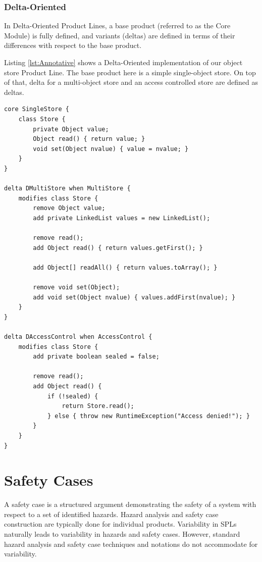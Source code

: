 \documentclass[11pt]{article}
\begin{document}
\subsubsection{Delta-Oriented}

In Delta-Oriented \cite{Schaefer} Product Lines, a base product (referred to as the Core Module) is fully defined, and variants (deltas) are defined in terms of their differences with respect to the base product. 

Listing \ref{lst:Annotative} shows a Delta-Oriented implementation of our object store Product Line. The base product here is a simple single-object store. On top of that, delta for a multi-object store and an access controlled store are defined as deltas. 
 
\begin{lstlisting}[caption=Annotative example, label={lst:Annotative}]
core SingleStore {
	class Store {
		private Object value;
		Object read() { return value; }
		void set(Object nvalue) { value = nvalue; }
	} 
}

delta DMultiStore when MultiStore {
	modifies class Store {
		remove Object value;
		add private LinkedList values = new LinkedList();

		remove read();
		add Object read() { return values.getFirst(); }

		add Object[] readAll() { return values.toArray(); }

		remove void set(Object);
		add void set(Object nvalue) { values.addFirst(nvalue); }
	}
}

delta DAccessControl when AccessControl {
	modifies class Store {
		add private boolean sealed = false;

		remove read();
		add Object read() {
			if (!sealed) {
				return Store.read();
			} else { throw new RuntimeException("Access denied!"); }
		}
	}
}
\end{lstlisting}

\section{Safety Cases}

A safety case is a structured argument demonstrating the safety of a system with respect to a set of identified hazards. Hazard analysis and safety case construction are typically done for individual products. Variability in SPLs naturally leads to variability in hazards and safety cases. However, standard hazard analysis and safety case techniques and notations do not accommodate for variability. 
 
\end{document}
